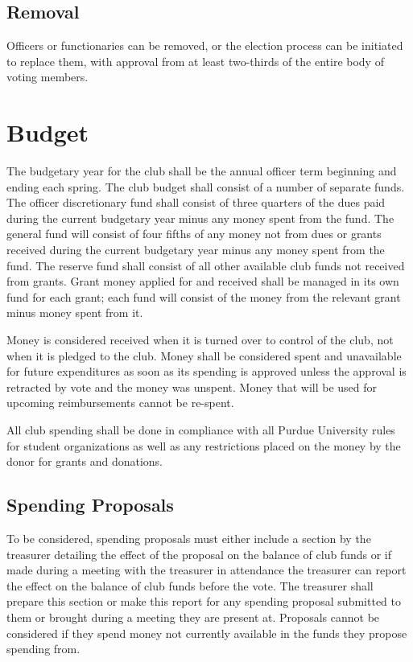 \documentclass{article}
\begin{document}
\subsection{Removal}

Officers or functionaries can be removed, or the election process can be
initiated to replace them, with approval from at least two-thirds of the entire
body of voting members.

\section{Budget}

The budgetary year for the club shall be the annual officer term beginning and
ending each spring. The club budget shall consist of a number of separate funds.
The officer discretionary fund shall consist of three quarters of the dues paid
during the current budgetary year minus any money spent from the fund. The
general fund will consist of four fifths of any money not from dues or grants
received during the current budgetary year minus any money spent from the fund.
The reserve fund shall consist of all other available club funds not received
from grants. Grant money applied for and received shall be managed in its own
fund for each grant; each fund will consist of the money from the relevant grant
minus money spent from it.

Money is considered received when it is turned over to control of the club, not
when it is pledged to the club. Money shall be considered spent and unavailable
for future expenditures as soon as its spending is approved unless the approval
is retracted by vote and the money was unspent. Money that will be used for
upcoming reimbursements cannot be re-spent.

All club spending shall be done in compliance with all Purdue University rules
for student organizations as well as any restrictions placed on the money by the
donor for grants and donations.

\subsection{Spending Proposals}

To be considered, spending proposals must either include a section by the
treasurer detailing the effect of the proposal on the balance of club funds or
if made during a meeting with the treasurer in attendance the treasurer can
report the effect on the balance of club funds before the vote. The treasurer
shall prepare this section or make this report for any spending proposal
submitted to them or brought during a meeting they are present at. Proposals
cannot be considered if they spend money not currently available in the funds
they propose spending from.
\end{document}
